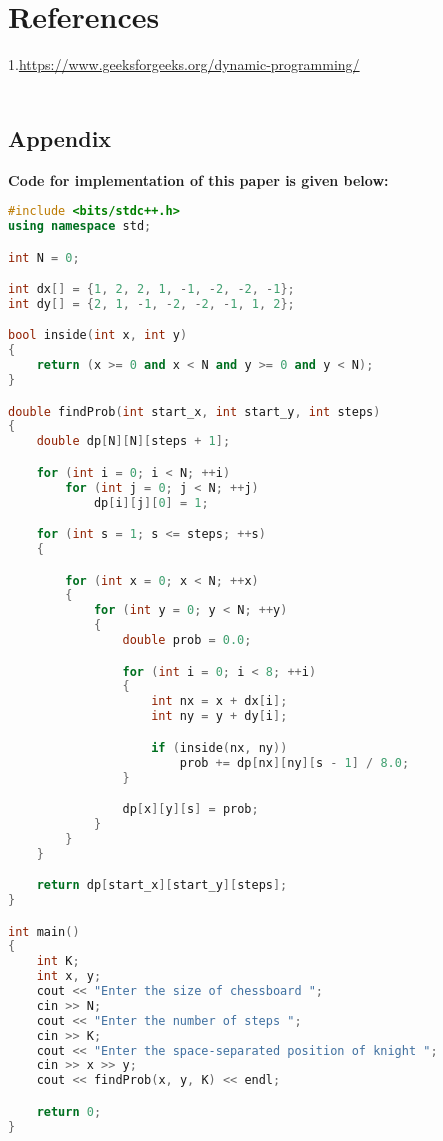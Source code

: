\documentclass[conference]{IEEEtran}
\begin{document}
 \section{References}
\color{blue}1.{\url{https://www.geeksforgeeks.org/dynamic-programming/} }\\


\color{black}
\
\begin{titlepage}
    \begin{center}
        \Huge
        \section*{Appendix}
        \end{center}
         \textbf{Code for implementation of this paper is given below:}
\begin{lstlisting}[language=C++,caption=Code for this paper]
#include <bits/stdc++.h>
using namespace std;

int N = 0;

int dx[] = {1, 2, 2, 1, -1, -2, -2, -1};
int dy[] = {2, 1, -1, -2, -2, -1, 1, 2};

bool inside(int x, int y)
{
    return (x >= 0 and x < N and y >= 0 and y < N);
}

double findProb(int start_x, int start_y, int steps)
{
    double dp[N][N][steps + 1];

    for (int i = 0; i < N; ++i)
        for (int j = 0; j < N; ++j)
            dp[i][j][0] = 1;

    for (int s = 1; s <= steps; ++s)
    {

        for (int x = 0; x < N; ++x)
        {
            for (int y = 0; y < N; ++y)
            {
                double prob = 0.0;

                for (int i = 0; i < 8; ++i)
                {
                    int nx = x + dx[i];
                    int ny = y + dy[i];

                    if (inside(nx, ny))
                        prob += dp[nx][ny][s - 1] / 8.0;
                }

                dp[x][y][s] = prob;
            }
        }
    }

    return dp[start_x][start_y][steps];
}

int main()
{
    int K;
    int x, y;
    cout << "Enter the size of chessboard ";
    cin >> N;
    cout << "Enter the number of steps ";
    cin >> K;
    cout << "Enter the space-separated position of knight ";
    cin >> x >> y;
    cout << findProb(x, y, K) << endl;

    return 0;
}

   
\end{lstlisting}
\end{titlepage}
\end{document}
